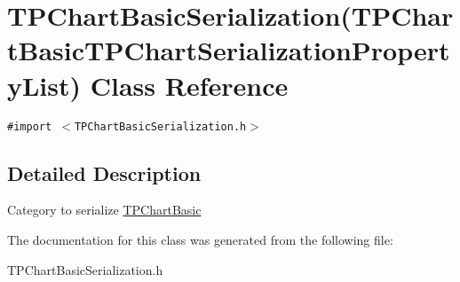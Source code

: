 \hypertarget{interface_t_p_chart_basic_serialization_07_t_p_chart_basic_t_p_chart_serialization_property_list_08}{
\section{TPChartBasicSerialization(TPChartBasicTPChartSerializationPropertyList) Class Reference}
\label{interface_t_p_chart_basic_serialization_07_t_p_chart_basic_t_p_chart_serialization_property_list_08}
}
{\tt \#import $<$TPChartBasicSerialization.h$>$}



\subsection{Detailed Description}
Category to serialize \hyperlink{interface_t_p_chart_basic}{TPChartBasic} 

The documentation for this class was generated from the following file:\begin{CompactItemize}
\item 
TPChartBasicSerialization.h\end{CompactItemize}

